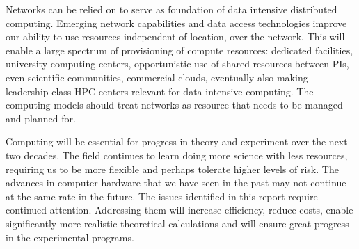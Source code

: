 Networks can be relied on to serve as foundation of data intensive distributed computing. Emerging network capabilities and data access technologies improve our ability to use resources independent of location, over the network. This will enable a large spectrum of provisioning of compute resources: dedicated facilities, university computing centers, opportunistic use of shared resources between PIs, even scientific communities, commercial clouds, eventually also making leadership-class HPC centers relevant for data-intensive computing. The computing models should treat networks as resource that needs to be managed and planned for. 

Computing will be essential for progress in theory and experiment over the next two decades.  The field continues to learn doing more science with less resources, requiring us to be more flexible and perhaps tolerate higher levels of risk. The advances in computer hardware that we have seen in the past may not continue at the same rate in the future.  The issues identified in this report require continued attention. Addressing them will increase efficiency, reduce costs, enable significantly more realistic theoretical calculations and will ensure great progress in the experimental programs.
